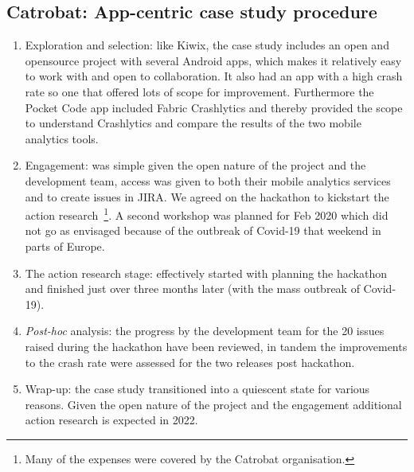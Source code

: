 \subsection{Catrobat: App-centric case study procedure}
{\small
\begin{enumerate}
    \itemsep0em
    \item Exploration and selection: like Kiwix, the case study includes an open and opensource project with several Android apps, which makes it relatively easy to work with and open to collaboration. It also had an app with a high crash rate so one that offered lots of scope for improvement. Furthermore the Pocket Code app included Fabric Crashlytics and thereby provided the scope to understand Crashlytics and compare the results of the two mobile analytics tools. 
    \item Engagement: was simple given the open nature of the project and the development team, access was given to both their mobile analytics services and to create issues in JIRA. We agreed on the hackathon to kickstart the action research~\footnote{Many of the expenses were covered by the Catrobat organisation.}. A second workshop was planned for  Feb 2020 which did not go as envisaged because of the outbreak of Covid-19 that weekend in parts of Europe.
    \item The action research stage: effectively started with planning the hackathon and finished just over three months later (with the mass outbreak of Covid-19).
    \item \textit{Post-hoc} analysis: the progress by the development team for the 20 issues raised during the hackathon have been reviewed, in tandem the improvements to the crash rate were assessed for the two releases post hackathon.
    \item Wrap-up: the case study transitioned into a quiescent state for various reasons. Given the open nature of the project and the engagement additional action research is expected in 2022.
\end{enumerate}
}



